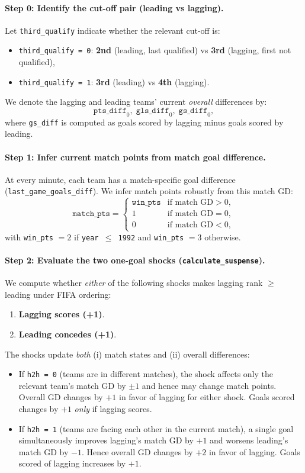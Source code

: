 \documentclass[11pt]{article}
\begin{document}
\paragraph{Step 0: Identify the cut-off pair (leading vs lagging).}
Let \texttt{third\_qualify} indicate whether the relevant cut-off is:
\begin{itemize}
    \item \texttt{third\_qualify = 0}: \textbf{2nd} (leading, last qualified) vs \textbf{3rd} (lagging, first not qualified),
    \item \texttt{third\_qualify = 1}: \textbf{3rd} (leading) vs \textbf{4th} (lagging).
\end{itemize}
We denote the lagging and leading teams' current \emph{overall} differences by:
\[
\texttt{pts\_diff}_0,\;\texttt{gls\_diff}_0,\;\texttt{gs\_diff}_0,
\]
where \texttt{gs\_diff} is computed as goals scored by lagging minus goals scored by leading.

\paragraph{Step 1: Infer current match points from match goal difference.}
At every minute, each team has a match-specific goal difference (\texttt{last\_game\_goals\_diff}).
We infer match points robustly from this match GD:
\[
\texttt{match\_pts} =
\begin{cases}
\texttt{win\_pts} & \text{if match GD} > 0,\\
1 & \text{if match GD} = 0,\\
0 & \text{if match GD} < 0,
\end{cases}
\]
with \texttt{win\_pts} $=2$ if \texttt{year $\le$ 1992} and \texttt{win\_pts} $=3$ otherwise.

\paragraph{Step 2: Evaluate the two one-goal shocks (\texttt{calculate\_suspense}).}
We compute whether \emph{either} of the following shocks makes lagging rank $\ge$ leading under FIFA ordering:
\begin{enumerate}
    \item \textbf{Lagging scores (+1)}.
    \item \textbf{Leading concedes (+1)}.
\end{enumerate}

\noindent The shocks update \emph{both} (i) match states and (ii) overall differences:
\begin{itemize}
    \item If \texttt{h2h = 0} (teams are in different matches), the shock affects only the relevant team's match GD by $\pm 1$ and hence may change match points. Overall GD changes by $+1$ in favor of lagging for either shock. Goals scored changes by $+1$ \emph{only} if lagging scores.
    \item If \texttt{h2h = 1} (teams are facing each other in the current match), a single goal simultaneously improves lagging's match GD by $+1$ and worsens leading's match GD by $-1$. Hence overall GD changes by $+2$ in favor of lagging. Goals scored of lagging increases by $+1$.
\end{itemize}
\end{document}
